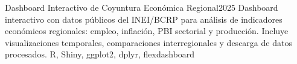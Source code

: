 
\begin{projects}


	\project
	{Dashboard Interactivo de Coyuntura Económica Regional}{2025}
	{ }
	{Dashboard interactivo con datos públicos del INEI/BCRP para análisis de indicadores económicos regionales: empleo, inflación, PBI sectorial y producción. Incluye visualizaciones temporales, comparaciones interregionales y descarga de datos procesados.}
	{R, Shiny, ggplot2, dplyr, flexdashboard}
	\emptySeparator







\end{projects}
